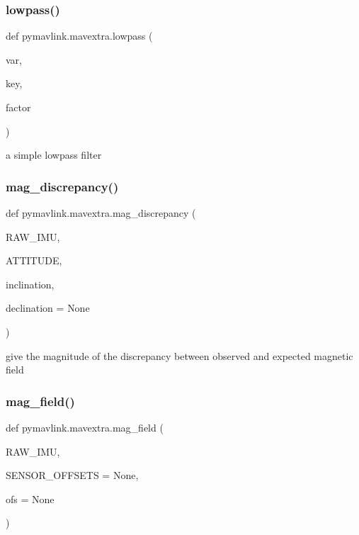 \subsubsection{\texorpdfstring{lowpass()}{lowpass()}}
{\footnotesize\ttfamily def pymavlink.\+mavextra.\+lowpass (\begin{DoxyParamCaption}\item[{}]{var,  }\item[{}]{key,  }\item[{}]{factor }\end{DoxyParamCaption})}

\begin{DoxyVerb}a simple lowpass filter\end{DoxyVerb}
 \mbox{\label{namespacepymavlink_1_1mavextra_aaae8d1963031a79098cf818d480e0756}} 
\subsubsection{\texorpdfstring{mag\+\_\+discrepancy()}{mag\_discrepancy()}}
{\footnotesize\ttfamily def pymavlink.\+mavextra.\+mag\+\_\+discrepancy (\begin{DoxyParamCaption}\item[{}]{R\+A\+W\+\_\+\+I\+MU,  }\item[{}]{A\+T\+T\+I\+T\+U\+DE,  }\item[{}]{inclination,  }\item[{}]{declination = {\ttfamily None} }\end{DoxyParamCaption})}

\begin{DoxyVerb}give the magnitude of the discrepancy between observed and expected magnetic field\end{DoxyVerb}
 \mbox{\label{namespacepymavlink_1_1mavextra_ae2c6b9c7ca47d69bc730cfc544c41b62}} 
\subsubsection{\texorpdfstring{mag\+\_\+field()}{mag\_field()}}
{\footnotesize\ttfamily def pymavlink.\+mavextra.\+mag\+\_\+field (\begin{DoxyParamCaption}\item[{}]{R\+A\+W\+\_\+\+I\+MU,  }\item[{}]{S\+E\+N\+S\+O\+R\+\_\+\+O\+F\+F\+S\+E\+TS = {\ttfamily None},  }\item[{}]{ofs = {\ttfamily None} }\end{DoxyParamCaption})}

